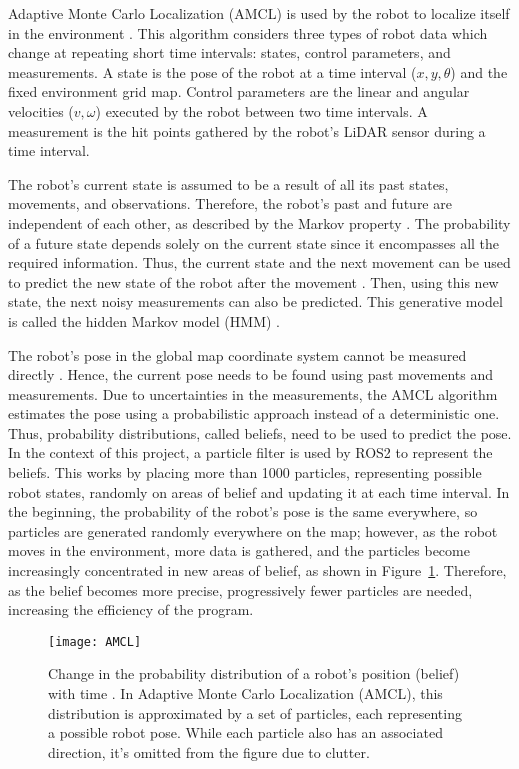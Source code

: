 Adaptive Monte Carlo Localization (AMCL) is used by the robot to localize itself in the environment \parencite{thrunProbabilisticRobotics2006}. This algorithm considers three types of robot data which change at repeating short time intervals: states, control parameters, and measurements. A state is the pose of the robot at a time interval ($x,y,\theta$) and the fixed environment grid map. Control parameters are the linear and angular velocities ($v,\omega$) executed by the robot between two time intervals. A measurement is the hit points gathered by the robot's LiDAR sensor during a time interval.

The robot's current state is assumed to be a result of all its past states, movements, and observations. Therefore, the robot's past and future are independent of each other, as described by the Markov property \parencite{MarkovProperty2024a}. The probability of a future state depends solely on the current state since it encompasses all the required information. Thus, the current state and the next movement can be used to predict the new state of the robot after the movement \parencite{thrunProbabilisticRobotics2006}. Then, using this new state, the next noisy measurements can also be predicted. This generative model is called the hidden Markov model (HMM) \parencite{thrunProbabilisticRobotics2006}.

The robot's pose in the global map coordinate system cannot be measured directly \parencite{matlabUnderstandingParticleFilter2020,thrunProbabilisticRobotics2006}. Hence, the current pose needs to be found using past movements and measurements. Due to uncertainties in the measurements, the AMCL algorithm estimates the pose using a probabilistic approach instead of a deterministic one. Thus, probability distributions, called beliefs, need to be used to predict the pose. In the context of this project, a particle filter is used by ROS2 to represent the beliefs. This works by placing more than 1000 particles, representing possible robot states, randomly on areas of belief and updating it at each time interval. In the beginning, the probability of the robot's pose is the same everywhere, so particles are generated randomly everywhere on the map; however, as the robot moves in the environment, more data is gathered, and the particles become increasingly concentrated in new areas of belief, as shown in Figure \ref{fig:belief}. Therefore, as the belief becomes more precise, progressively fewer particles are needed, increasing the efficiency of the program.

\begin{figure}[!htb]
    \texttt{[image: AMCL]}
    \centering
    \caption{Change in the probability distribution of a robot's position (belief) with time \parencite{thrunProbabilisticRobotics2006}. In Adaptive Monte Carlo Localization (AMCL), this distribution is approximated by a set of particles, each representing a possible robot pose. While each particle also has an associated direction, it's omitted from the figure due to clutter.}
    \label{fig:belief}
\end{figure}
\filbreak
